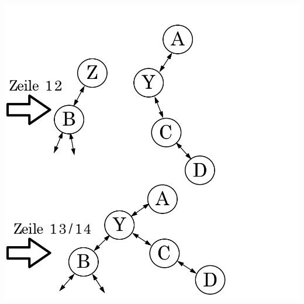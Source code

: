 \documentclass[a4paper,11pt,twoside]{article}
\begin{document}
\includegraphics*[scale=0.2]{Images/D_step_3.png}
\end{document}
